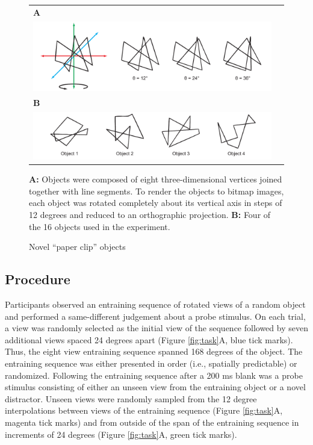 \documentclass[dwyatte_dissertation.tex]{subfiles}
\begin{document}
\begin{figure}[h!]
\begin{center}
\begin{tabular}{ll}
\textbf{A} \\
\includegraphics[width=160mm]{figs/pleast/paperclip_rots.pdf} \\
\textbf{B} \\
\includegraphics[width=160mm]{figs/pleast/paperclip_objs.pdf} \\
\end{tabular}
\end{center}
\caption{Novel ``paper clip'' objects}{\textbf{A:} Objects were composed of eight three-dimensional vertices joined together with line segments. To render the objects to bitmap images, each object was rotated completely about its vertical axis in steps of 12 degrees and reduced to an orthographic projection. \textbf{B:} Four of the 16 objects used in the experiment.}
\label{fig:paperclip}
\end{figure}

\subsection{Procedure}
Participants observed an entraining sequence of rotated views of a random object and performed a same-different judgement about a probe stimulus. On each trial, a view was randomly selected as the initial view of the sequence followed by seven additional views spaced 24 degrees apart (Figure \ref{fig:task}A, blue tick marks). Thus, the eight view entraining sequence spanned 168 degrees of the object. The entraining sequence was either presented in order (i.e., spatially predictable) or randomized. Following the entraining sequence after a 200 ms blank was a probe stimulus consisting of either an unseen view from the entraining object or a novel distractor. Unseen views were randomly sampled from the 12 degree interpolations between views of the entraining sequence (Figure \ref{fig:task}A, magenta tick marks) and from outside of the span of the entraining sequence in increments of 24 degrees (Figure \ref{fig:task}A, green tick marks).
\end{document}
